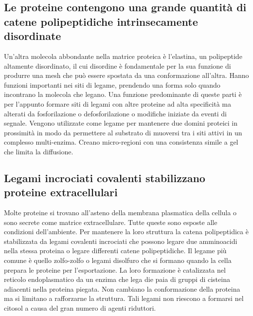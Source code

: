 \subsection{Le proteine contengono una grande quantit\`a di catene polipeptidiche intrinsecamente disordinate}
Un'altra molecola abbondante nella matrice proteica \`e l'elastina, un polipeptide altamente disordinato, il cui disordine \`e fondamentale per la sua funzione di produrre una mesh che
pu\`o essere spostata da una conformazione all'altra. Hanno funzioni importanti nei siti di legame, prendendo una forma solo quando incontrano la molecola che legano. Una funzione 
predominante di queste parti \`e per l'appunto formare siti di legami con altre proteine ad alta specificit\`a ma alterati da fosforilazione o defosforilazione o modifiche iniziate da
eventi di segnale. Vengono utilizzate come legame per mantenere due domini proteici in prossimit\`a in modo da permettere al substrato di muoversi tra i siti attivi in un complesso 
multi-enzima. Creano micro-regioni con una consistenza simile a gel che limita la diffusione. 
\subsection{Legami incrociati covalenti stabilizzano proteine extracellulari}
Molte proteine si trovano all'asteno della membrana plasmatica della cellula o sono secrete come matrice extracellulare. Tutte queste sono esposte alle condizioni dell'ambiente. Per 
mantenere la loro struttura la catena polipeptidica \`e stabilizzata da legami covalenti incrociati che possono legare due amminoacidi nella stessa proteina o legare differenti catene
polipeptidiche. Il legame pi\`u comune \`e quello zolfo-zolfo o legami disolfuro che si formano quando la cella prepara le proteine per l'esportazione. La loro formazione \`e catalizzata
nel reticolo endoplasmatico da un enzima che lega die paia di gruppi  di cisteina adiacenti nella proteina piegata. Non cambiano la conformazione della proteina ma si limitano
a rafforzarne la struttura. Tali legami non riescono a formarsi nel citosol a causa del gran numero di agenti riduttori.
